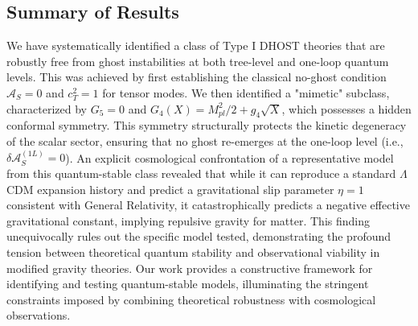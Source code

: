 \documentclass[twocolumn]{aastex631}
\begin{document}
\subsection{Summary of Results}
We have systematically identified a class of Type I DHOST theories that are robustly free from ghost instabilities at both tree-level and one-loop quantum levels. This was achieved by first establishing the classical no-ghost condition $\mathcal{A}_S=0$ and $c_T^2=1$ for tensor modes. We then identified a "mimetic" subclass, characterized by $G_5=0$ and $G_4(X) = M_{pl}^2/2 + g_4\sqrt{X}$, which possesses a hidden conformal symmetry. This symmetry structurally protects the kinetic degeneracy of the scalar sector, ensuring that no ghost re-emerges at the one-loop level (i.e., $\delta\mathcal{A}_S^{(1L)}=0$). An explicit cosmological confrontation of a representative model from this quantum-stable class revealed that while it can reproduce a standard $\Lambda$CDM expansion history and predict a gravitational slip parameter $\eta=1$ consistent with General Relativity, it catastrophically predicts a negative effective gravitational constant, implying repulsive gravity for matter. This finding unequivocally rules out the specific model tested, demonstrating the profound tension between theoretical quantum stability and observational viability in modified gravity theories. Our work provides a constructive framework for identifying and testing quantum-stable models, illuminating the stringent constraints imposed by combining theoretical robustness with cosmological observations.
\end{document}
